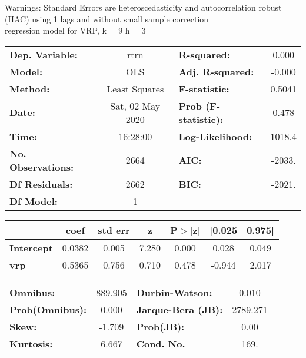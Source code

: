 Warnings: \newline
 [1] Standard Errors are heteroscedasticity and autocorrelation robust (HAC) using 1 lags and without small sample correction\\ 

regression model for VRP, k = 9 h = 3\begin{center}
\begin{tabular}{lclc}
\toprule
\textbf{Dep. Variable:}    &       rtrn       & \textbf{  R-squared:         } &     0.000   \\
\textbf{Model:}            &       OLS        & \textbf{  Adj. R-squared:    } &    -0.000   \\
\textbf{Method:}           &  Least Squares   & \textbf{  F-statistic:       } &    0.5041   \\
\textbf{Date:}             & Sat, 02 May 2020 & \textbf{  Prob (F-statistic):} &    0.478    \\
\textbf{Time:}             &     16:28:00     & \textbf{  Log-Likelihood:    } &    1018.4   \\
\textbf{No. Observations:} &        2664      & \textbf{  AIC:               } &    -2033.   \\
\textbf{Df Residuals:}     &        2662      & \textbf{  BIC:               } &    -2021.   \\
\textbf{Df Model:}         &           1      & \textbf{                     } &             \\
\bottomrule
\end{tabular}
\begin{tabular}{lcccccc}
                   & \textbf{coef} & \textbf{std err} & \textbf{z} & \textbf{P$> |$z$|$} & \textbf{[0.025} & \textbf{0.975]}  \\
\midrule
\textbf{Intercept} &       0.0382  &        0.005     &     7.280  &         0.000        &        0.028    &        0.049     \\
\textbf{vrp}       &       0.5365  &        0.756     &     0.710  &         0.478        &       -0.944    &        2.017     \\
\bottomrule
\end{tabular}
\begin{tabular}{lclc}
\textbf{Omnibus:}       & 889.905 & \textbf{  Durbin-Watson:     } &    0.010  \\
\textbf{Prob(Omnibus):} &   0.000 & \textbf{  Jarque-Bera (JB):  } & 2789.271  \\
\textbf{Skew:}          &  -1.709 & \textbf{  Prob(JB):          } &     0.00  \\
\textbf{Kurtosis:}      &   6.667 & \textbf{  Cond. No.          } &     169.  \\
\bottomrule
\end{tabular}
\end{center}

